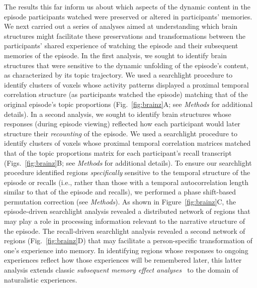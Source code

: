 \documentclass[10pt]{article}
\begin{document}
The results this far inform us about which aspects of the dynamic content in the episode participants watched were preserved or altered in participants' memories.  We next carried out a series of analyses aimed at understanding which brain structures might facilitate these preservations and transformations between the participants' shared experience of watching the episode and their subsequent memories of the episode.  In the first analysis, we sought to identify brain structures that were sensitive to the dynamic unfolding of the episode's content, as characterized by its topic trajectory.  We used a searchlight procedure to identify clusters of voxels whose activity patterns displayed a proximal temporal correlation structure (as participants watched the episode) matching that of the original episode's topic proportions (Fig.~\ref{fig:brainz}A; see \textit{Methods} for additional details).  In a second analysis, we sought to identify brain structures whose responses (during episode viewing) reflected how each participant would later structure their \textit{recounting} of the episode.  We used a searchlight procedure to identify clusters of voxels whose proximal temporal correlation matrices matched that of the topic proportions matrix for each participant's recall transcript (Figs.~\ref{fig:brainz}B; see \textit{Methods} for additional details).  To ensure our searchlight procedure identified regions \textit{specifically} sensitive to the temporal structure of the episode or recalls (i.e., rather than those with a temporal autocorrelation length similar to that of the episode and recalls), we performed a phase shift-based permutation correction (see \textit{Methods}). As shown in Figure~\ref{fig:brainz}C, the episode-driven searchlight analysis revealed a distributed network of regions that may play a role in processing information relevant to the narrative structure of the episode.  The recall-driven searchlight analysis revealed a second network of regions (Fig.~\ref{fig:brainz}D) that may facilitate a person-specific transformation of one's experience into memory.  In identifying regions whose responses to ongoing experiences reflect how those experiences will be remembered later, this latter analysis extends classic \textit{subsequent memory effect analyses}~\citep[e.g.,][]{PallWagn02} to the domain of naturalistic experiences.
\end{document}
